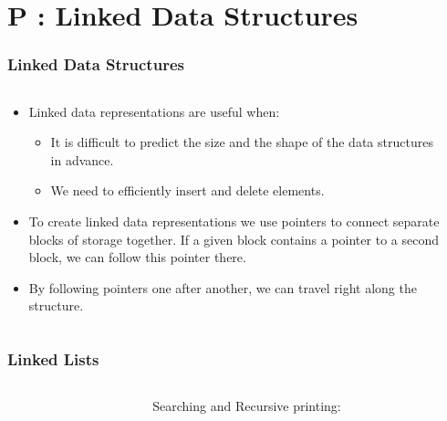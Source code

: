 \section{P : Linked Data Structures}
\label{chap:linked}


\begin{frame}[fragile]
\frametitle{Linked Data Structures}
\begin{columns}[T]

\begin{column}{0.45\textwidth}
\begin{itemize}[<+->]
\item Linked data representations are useful when:
\begin{itemize}[<+->]
\item It is difficult to predict the size and the shape of the data structures in advance.
\item We need to efficiently insert and delete elements.
\end{itemize}
\item To create linked data representations we use pointers to connect separate
blocks of storage together. If a given block contains a pointer to a second
block, we can follow this pointer there.
\item By following pointers one after another, we can travel right along
the structure.
\end{itemize}
\end{column}

\pause
\begin{column}{0.45\textwidth}

\end{column}

\end{columns}
\end{frame}



\begin{frame}[fragile]
\frametitle{Linked Lists}
\begin{columns}[T]

\begin{column}{0.45\textwidth}

\end{column}

\pause
\begin{column}{0.45\textwidth}
Searching and Recursive printing:

\end{column}

\end{columns}
\end{frame}

